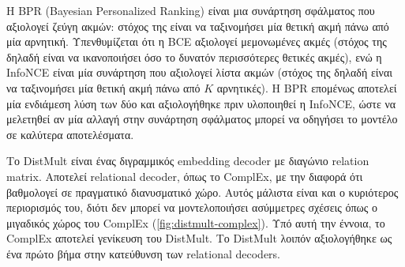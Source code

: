 Η BPR (Bayesian Personalized Ranking) \cite{rendle_bpr_2009} είναι μια συνάρτηση σφάλματος που αξιολογεί ζεύγη ακμών: στόχος της είναι να ταξινομήσει μία θετική ακμή πάνω από μία αρνητική. Υπενθυμίζεται ότι η BCE αξιολογεί μεμονωμένες ακμές (στόχος της δηλαδή είναι να ικανοποιήσει όσο το δυνατόν περισσότερες θετικές ακμές), ενώ η InfoNCE είναι μία συνάρτηση που αξιολογεί λίστα ακμών (στόχος της δηλαδή είναι να ταξινομήσει μία θετική ακμή πάνω από $K$ αρνητικές). Η BPR επομένως αποτελεί μία ενδιάμεση λύση των δύο και αξιολογήθηκε πριν υλοποιηθεί η InfoNCE, ώστε να μελετηθεί αν μία αλλαγή στην συνάρτηση σφάλματος μπορεί να οδηγήσει το μοντέλο σε καλύτερα αποτελέσματα.

Το DistMult \cite{yang_embedding_2015} είναι ένας διγραμμικός embedding decoder με διαγώνιο relation matrix. Αποτελεί relational decoder, όπως το ComplEx, με την διαφορά ότι βαθμολογεί σε πραγματικό διανυσματικό χώρο. Αυτός μάλιστα είναι και ο κυριότερος περιορισμός του, διότι δεν μπορεί να μοντελοποιήσει ασύμμετρες σχέσεις όπως ο μιγαδικός χώρος του ComplEx (\autoref{fig:distmult-complex}). Υπό αυτή την έννοια, το ComplEx αποτελεί γενίκευση του DistMult. Το DistMult λοιπόν αξιολογήθηκε ως ένα πρώτο βήμα στην κατεύθυνση των relational decoders.

